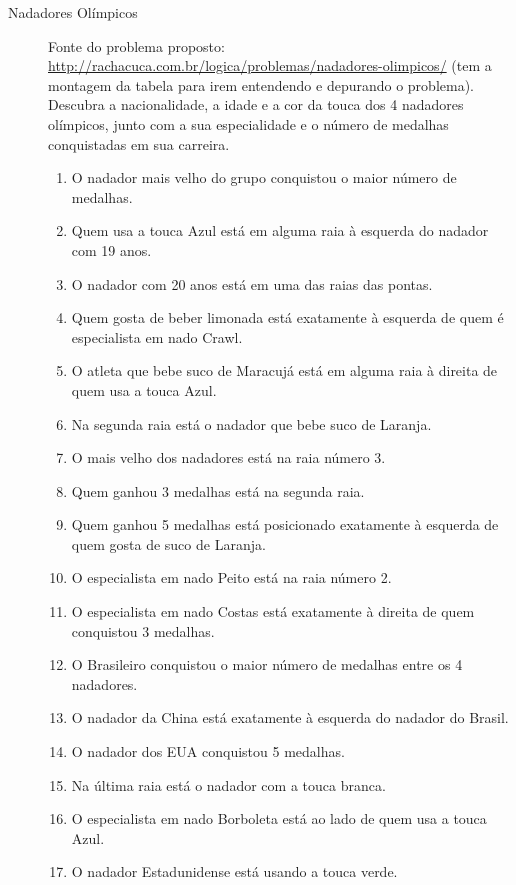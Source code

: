 \documentclass[a4paper,11pt]{article}
\begin{document}
\begin{description}
\begin{enumerate}
  \end{enumerate}  




  \item[Nadadores Olímpicos] Fonte do problema proposto:
  \url{http://rachacuca.com.br/logica/problemas/nadadores-olimpicos/} (tem a montagem da tabela para irem entendendo e depurando o problema).\\

Descubra a nacionalidade, a idade e a cor da touca dos 4 nadadores olímpicos, junto com a sua especialidade e o número de medalhas conquistadas em sua carreira.

\begin{enumerate}
  \item  O nadador mais velho do grupo conquistou o maior número de medalhas.
   \item Quem usa a touca Azul está em alguma raia à esquerda do nadador com 19 anos.
   \item O nadador com 20 anos está em uma das raias das pontas.
   \item Quem gosta de beber limonada está exatamente à esquerda de quem é especialista em nado Crawl.
   \item  O atleta que bebe suco de Maracujá está em alguma raia à direita de quem usa a touca Azul.
   \item Na segunda raia está o nadador que bebe suco de Laranja.
   \item O mais velho dos nadadores está na raia número 3.
   \item Quem ganhou 3 medalhas está na segunda raia.
   \item Quem ganhou 5 medalhas está posicionado exatamente à esquerda de quem gosta de suco de Laranja.
\item  O especialista em nado Peito está na raia número 2.
\item  O especialista em nado Costas está exatamente à direita de quem conquistou 3 medalhas.
\item  O Brasileiro conquistou o maior número de medalhas entre os 4 nadadores.
\item  O nadador da China está exatamente à esquerda do nadador do Brasil.
\item  O nadador dos EUA conquistou 5 medalhas.
\item  Na última raia está o nadador com a touca branca.
\item  O especialista em nado Borboleta está ao lado de quem usa a touca Azul.
\item  O nadador Estadunidense está usando a touca verde.

 \end{enumerate}  
 
\end{description}
\end{document}
